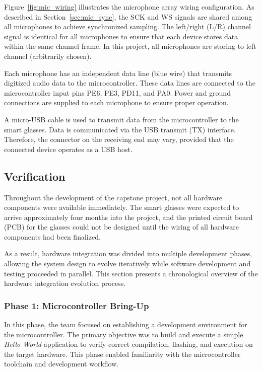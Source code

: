 \documentclass[12pt, titlepage]{article}
\begin{document}
Figure~\ref{fig:mic_wiring} illustrates the microphone array wiring
configuration. As described in Section~\ref{sec:mic_sync}, the SCK and WS
signals are shared among all microphones to achieve synchronized sampling. The
left/right (L/R) channel signal is identical for all microphones to ensure that
each device stores data within the same channel frame. In this project, all
microphones are storing to left channel (arbitrarily chosen).

Each microphone has an independent data line (blue wire) that transmits
digitized audio data to the microcontroller. These data lines are connected to
the microcontroller input pins PE6, PE3, PD11, and PA0. Power and ground
connections are supplied to each microphone to ensure proper operation.

A micro-USB cable is used to transmit data from the microcontroller to the smart
glasses. Data is communicated via the USB transmit (TX) interface. Therefore,
the connector on the receiving end may vary, provided that the connected device
operates as a USB host.

\subsection{Verification}

Throughout the development of the capstone project, not all hardware components
were available immediately. The smart glasses were expected to arrive
approximately four months into the project, and the printed circuit board (PCB)
for the glasses could not be designed until the wiring of all hardware
components had been finalized. 

As a result, hardware integration was divided into multiple development phases,
allowing the system design to evolve iteratively while software development and
testing proceeded in parallel. This section presents a chronological overview of
the hardware integration evolution process.

\subsubsection{Phase 1: Microcontroller Bring-Up}
In this phase, the team focused on establishing a development environment for
the microcontroller. The primary objective was to build and execute a simple
\textit{Hello World} application to verify correct compilation, flashing, and
execution on the target hardware. This phase enabled familiarity with the
microcontroller toolchain and development workflow.
\end{document}
